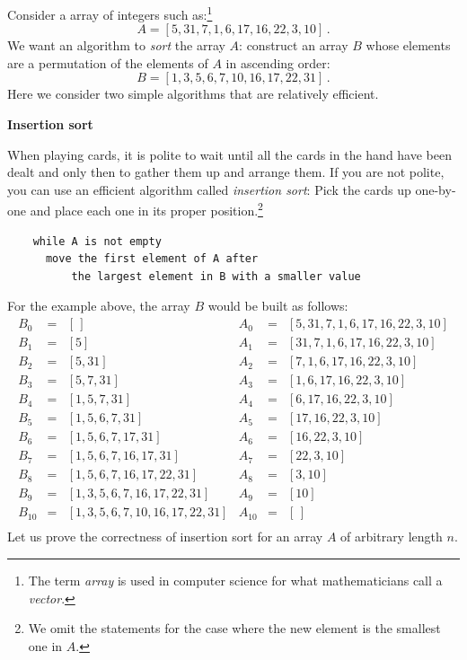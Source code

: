 \documentclass[11pt,a4paper]{report}
\begin{document}
Consider a array of integers such as:\footnote{The term \emph{array} is used in computer science for what mathematicians call a \emph{vector}.}
\[
A=[5,31,7,1,6,17,16,22,3,10]\,.
\]
We want an algorithm to \emph{sort} the array $A$: construct an array $B$ whose elements are a permutation of the elements of $A$ in ascending order:
\[
B=[1,3,5,6,7,10,16,17,22,31]\,.
\]
Here we consider two simple algorithms that are relatively efficient.

\textbf{\Large Insertion sort}

When playing cards, it is polite to wait until all the cards in the hand have been dealt and only then to gather them up and arrange them. If you are not polite, you can use an efficient algorithm called \emph{insertion sort}: Pick the cards up one-by-one and place each one in its proper position.\footnote{We omit the statements for the case where the new element is the smallest one in $A$.} 
\begin{verbatim}
    while A is not empty
      move the first element of A after
          the largest element in B with a smaller value
\end{verbatim}
For the example above, the array $B$ would be built as follows:
\[
\begin{array}{lll}
B_0&=&[\,]\\
B_1&=&[5]\\
B_2&=&[5,31]\\
B_3&=&[5,7,31]\\
B_4&=&[1,5,7,31]\\
B_5&=&[1,5,6,7,31]\\
B_6&=&[1,5,6,7,17,31]\\
B_7&=&[1,5,6,7,16,17,31]\\
B_8&=&[1,5,6,7,16,17,22,31]\\
B_9&=&[1,3,5,6,7,16,17,22,31]\\
B_{10}&=&[1,3,5,6,7,10,16,17,22,31]\\
\end{array}
\begin{array}{lll}
A_0&=&[5,31,7,1,6,17,16,22,3,10]\\
A_1&=&[31,7,1,6,17,16,22,3,10]\\
A_2&=&[7,1,6,17,16,22,3,10]\\
A_3&=&[1,6,17,16,22,3,10]\\
A_4&=&[6,17,16,22,3,10]\\
A_5&=&[17,16,22,3,10]\\
A_6&=&[16,22,3,10]\\
A_7&=&[22,3,10]\\
A_8&=&[3,10]\\
A_9&=&[10]\\
A_{10}&=&[\,]\\
\end{array}
\]
Let us prove the correctness of insertion sort for an array $A$ of arbitrary length $n$.
\end{document}
